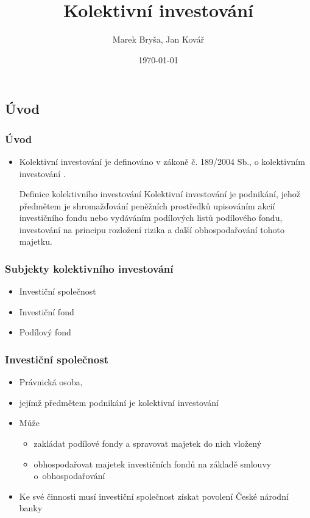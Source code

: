 \documentclass[xcolor=dvipsnames]{beamer}
\title{Kolektivní investování}
\author{Marek Bryša, Jan Kovář}
\institute
{
Masarykova Univerzita\\
Přírodovědecká fakulta
}
\date{\today}
\begin{document}
  \frame{\titlepage}
\begin{frame}
\section*{Úvod}
  \frametitle{Úvod}
  \begin{itemize} 
    \item Kolektivní investování je definováno v zákoně č. 189/2004 Sb., o kolektivním investování .
\begin{block}{Definice kolektivního investování}
Kolektivní investování je podnikání, jehož předmětem je
shromažďování peněžních prostředků upisováním akcií investičního fondu nebo vydáváním
podílových listů podílového fondu, investování na principu rozložení rizika a další
obhospodařování tohoto majetku.
  \end{block}
  \end{itemize} 

\end{frame}






\begin{frame}
\frametitle{Subjekty kolektivního investování} 
\begin{itemize}
  \item Investiční společnost
  \item Investiční fond
  \item Podílový fond
\end{itemize}
\end{frame}

\begin{frame}
\frametitle{Investiční společnost}
\begin{itemize} 
  \item Právnická osoba,
  \item jejímž předmětem podnikání je kolektivní investování
  \item Může
    \begin{itemize} 
      \item zakládat podílové fondy a spravovat majetek do nich vložený
      \item obhospodařovat majetek investičních fondů na základě smlouvy o~obhospodařování
    \end{itemize}
  \item Ke své činnosti musí investiční společnost získat povolení České národní banky
\end{itemize} 
\end{frame}
\end{document}
